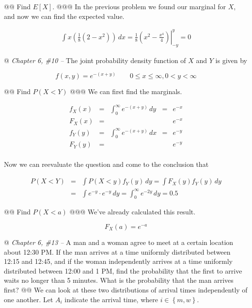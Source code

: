 \documentclass[11pt]{article}\usepackage[]{graphicx}\usepackage[]{xcolor}
\begin{document}
\begin{easylist}[enumerate]
    @@ Find $E[X]$.
    @@@ In the previous problem we found our marginal for $X$, and now we can find the expected value.

    \[
        \begin{aligned}
            \int x \left( \frac{1}{8} \left(2 - x^2\right)\right) \, dx =
            \left. \frac{1}{8} \left(x^2-\frac{x^4}{4}\right) \right|^y_{-y} = \boxed{0}
        \end{aligned}
    \]

    @ \textit{Chapter 6, \#10 --} The joint probability density function of $X$ and $Y$ is given by

    \[
        f(x, y) =
        e^{-(x + y)}
        \qquad 0 \le x \le \infty, 0 < y < \infty
    \]

    @@ Find $P(X < Y)$ 
    @@@ We can first find the marginals.

    \[
        \begin{aligned}
            f_X(x) &=& \int_0^\infty e^{-(x + y)} \, dy &=& e^{-x}\\
            F_X(x) &=& && e^{-x}\\
            f_Y(y) &=& \int_0^\infty e^{-(x + y)} \, dx &=& e^{-y}\\
            F_Y(y) &=& && e^{-y}\\
        \end{aligned}
    \]

    Now we can reevaluate the question and come to the conclusion that

    \[
        \begin{aligned}
            P(X < Y) &=& \int P(X < y) f_Y(y) \, dy = \int F_X(y) f_Y(y) \, dy\\
                     &=& \int e^{-y} \cdot e^{-y} \, dy = \int_0^\infty e^{-2y} \, dy = \boxed{0.5}
        \end{aligned}
    \]

    @@ Find $P(X < a)$
    @@@ We've already calculated this result.

    \[
        F_X(a) = e^{-a}
    \]

    @ \textit{Chapter 6, \#13 --} A man and a woman agree to meet at a certain location about 12:30 PM. If the man
    arrives at a time uniformly distributed between 12:15 and 12:45, and if the woman independently arrives at a time
    uniformly distributed between 12:00 and 1 PM, find the probability that the first to arrive waits no longer than 5
    minutes. What is the probability that the man arrives first?
    @@ We can look at these two distributions of arrival times independently of one another. Let $A_i$ indicate the
    arrival time, where $i \in \left\{ m, w \right\}$.


\end{easylist}
\end{document}

